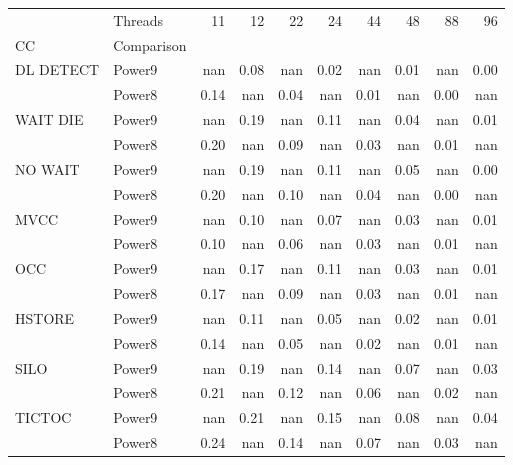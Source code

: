\begin{tabular}{llrrrrrrrr}
\toprule
       & Threads &   11 &   12 &   22 &   24 &   44 &   48 &   88 &   96 \\
CC & Comparison &      &      &      &      &      &      &      &      \\
\midrule
DL DETECT & Power9 &  nan & 0.08 &  nan & 0.02 &  nan & 0.01 &  nan & 0.00 \\
       & Power8 & 0.14 &  nan & 0.04 &  nan & 0.01 &  nan & 0.00 &  nan \\
WAIT DIE & Power9 &  nan & 0.19 &  nan & 0.11 &  nan & 0.04 &  nan & 0.01 \\
       & Power8 & 0.20 &  nan & 0.09 &  nan & 0.03 &  nan & 0.01 &  nan \\
NO WAIT & Power9 &  nan & 0.19 &  nan & 0.11 &  nan & 0.05 &  nan & 0.00 \\
       & Power8 & 0.20 &  nan & 0.10 &  nan & 0.04 &  nan & 0.00 &  nan \\
MVCC & Power9 &  nan & 0.10 &  nan & 0.07 &  nan & 0.03 &  nan & 0.01 \\
       & Power8 & 0.10 &  nan & 0.06 &  nan & 0.03 &  nan & 0.01 &  nan \\
OCC & Power9 &  nan & 0.17 &  nan & 0.11 &  nan & 0.03 &  nan & 0.01 \\
       & Power8 & 0.17 &  nan & 0.09 &  nan & 0.03 &  nan & 0.01 &  nan \\
HSTORE & Power9 &  nan & 0.11 &  nan & 0.05 &  nan & 0.02 &  nan & 0.01 \\
       & Power8 & 0.14 &  nan & 0.05 &  nan & 0.02 &  nan & 0.01 &  nan \\
SILO & Power9 &  nan & 0.19 &  nan & 0.14 &  nan & 0.07 &  nan & 0.03 \\
       & Power8 & 0.21 &  nan & 0.12 &  nan & 0.06 &  nan & 0.02 &  nan \\
TICTOC & Power9 &  nan & 0.21 &  nan & 0.15 &  nan & 0.08 &  nan & 0.04 \\
       & Power8 & 0.24 &  nan & 0.14 &  nan & 0.07 &  nan & 0.03 &  nan \\
\bottomrule
\end{tabular}
